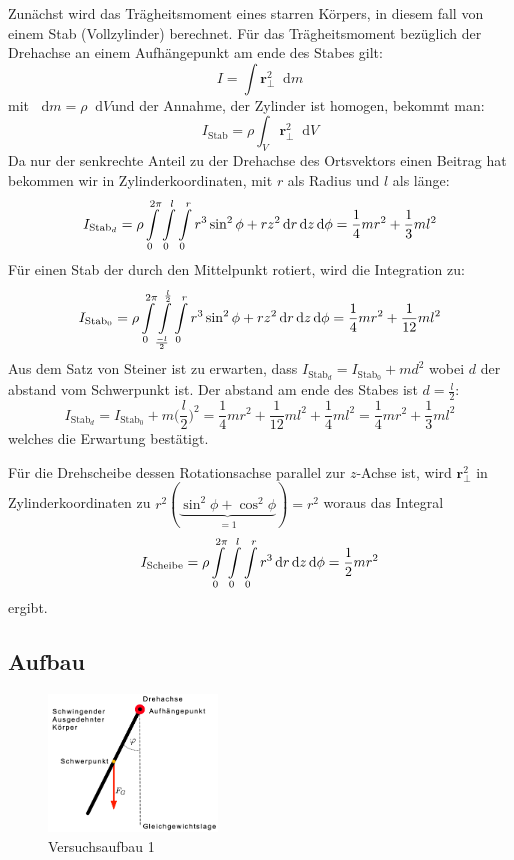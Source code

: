 \documentclass[11pt,a4paper]{article}
\newcommand\dif{\mathop{}\!\mathrm{d}}
\renewcommand{\vec}{\boldsymbol}
\begin{document}
Zunächst wird das Trägheitsmoment eines starren Körpers, in diesem fall von einem Stab (Vollzylinder) berechnet. Für das Trägheitsmoment bezüglich der Drehachse an einem Aufhängepunkt am ende des Stabes gilt:
$$I = \int \vec{r}_\perp^2 \dif m$$
mit $\dif m = \rho \dif V$und der Annahme, der Zylinder ist homogen, bekommt man: $$\displaystyle{I_{\textrm{Stab}} = \rho \int_V \vec{r}_\perp^2 \dif V}$$
Da nur der senkrechte Anteil zu der Drehachse des Ortsvektors einen Beitrag hat bekommen wir in Zylinderkoordinaten, mit $r$ als Radius und $l$ als länge:
$$I_{\textrm{Stab}_d} = \rho \int\displaylimits_{0}^{2\pi} \int\displaylimits_{0}^{l}\int\displaylimits_{0}^{r} r^3 \sin^2 \phi +rz^2 \dif r \dif z \dif\phi = \frac{1}{4} m r^2 + \frac{1}{3} m l^2 $$ 
Für einen Stab der durch den Mittelpunkt rotiert, wird die Integration zu:
$$I_{\textrm{Stab}_0} = \rho \int\displaylimits_{0}^{2\pi} \int\displaylimits_{\frac{-l}{2}}^{\frac{l}{2}}\int\displaylimits_{0}^{r} r^3 \sin^2 \phi +rz^2 \dif r \dif z \dif\phi = \frac{1}{4} m r^2 + \frac{1}{12} m l^2 $$
Aus dem Satz von Steiner ist zu erwarten, dass $I_{\textrm{Stab}_d} = I_{\textrm{Stab}_0} + md^2$ wobei $d$ der abstand vom  Schwerpunkt ist. Der abstand am ende des Stabes ist  $d = \frac{l}{2}$:
$$I_{\textrm{Stab}_d} = I_{\textrm{Stab}_0} + m\bigg(\frac{l}{2}\bigg)^2 = \frac{1}{4} m r^2 + \frac{1}{12} m l^2 + \frac{1}{4}ml^2 = \frac{1}{4} m r^2 + \frac{1}{3} m l^2$$
welches die Erwartung bestätigt.

Für die Drehscheibe dessen Rotationsachse parallel zur $z$-Achse ist, wird $\vec r_\perp^2$ in Zylinderkoordinaten zu $r^2(\underbrace{\sin^2\phi + \cos^2\phi}_{=1}) = r^2$ woraus das Integral
$$I_{\textrm{Scheibe}} = \rho \int\displaylimits_{0}^{2\pi} \int\displaylimits_{0}^{l}\int\displaylimits_{0}^{r} r^3 \dif r \dif z \dif\phi = \frac{1}{2}mr^2$$
ergibt.


\subsection{Aufbau}
\begin{figure}
\includegraphics[width=0.4\textwidth]{Spend}
\caption{Versuchsaufbau 1}
\label{JS1}
\end{figure}
\end{document}
